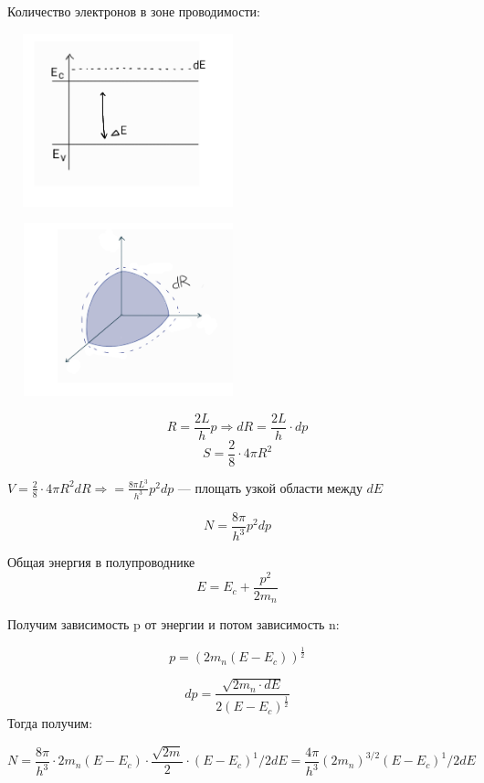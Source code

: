 \documentclass[../main.tex]{subfiles}
\begin{document}
Количество электронов в зоне проводимости:

\begin{center}
    \includegraphics[height=5cm, width=7cm]{../img/kvantovy13.png}
\end{center}

\begin{center}
    \includegraphics[height=5cm, width=7cm]{../img/kvantovy14.png}
\end{center}

\[R = \frac{2L}{h}p \Rightarrow dR = \frac{2L}{h}\cdot dp  \]
\[S = \frac{2}{8} \cdot 4 \pi R^2\]


\begin{center}
    \(\displaystyle V = \frac{2}{8} \cdot 4 \pi R^2 d R \Rightarrow = \frac{8 \pi L^3}{h^3} p^2 d p\) --- площать узкой области между $d E$ 
\end{center}

\[N = \frac{8 \pi}{h^3} p^2 d p\]

Общая энергия в полупроводнике
\[E = E_c + \frac{p^2}{2m_n}\]

Получим зависимость p от энергии и потом зависимость n:

\[p =  (2m_n(E-E_c))^\frac{1}{2}\]

\[d p  = \frac{\sqrt{2m_n \cdot dE}}{2(E - E_c)^{\frac{1}{2}}}\]
Тогда получим:

\[N = \frac{8 \pi}{h^3} \cdot 2m_n(E-E_c) \cdot \frac{\sqrt{2m}}{2} \cdot (E-E_c)^1/2 dE = \frac{4 \pi}{h^3}(2m_n)^{3/2} (E-E_c)^1/2 dE\]
\end{document}
